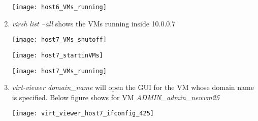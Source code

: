 \begin{enumerate}
\begin{minipage}{\linewidth}
\centering
\texttt{[image: host6\_VMs\_running]}
\end{minipage}

\item \textit{virsh list --all} shows the VMs running inside 10.0.0.7

\begin{minipage}{\linewidth}
\centering
\texttt{[image: host7\_VMs\_shutoff]}
\end{minipage}

\begin{minipage}{\linewidth}

\centering
\texttt{[image: host7\_startinVMs]}
\end{minipage}

\begin{minipage}{\linewidth}
\centering
\texttt{[image: host7\_VMs\_running]}
\end{minipage}

\item \textit{virt-viewer domain\_name} will open the GUI for the VM whose domain name is specified. Below figure shows for VM \textit{ADMIN\_admin\_newvm25}


\begin{minipage}{\linewidth}
\centering
\texttt{[image: virt\_viewer\_host7\_ifconfig\_425]}
\end{minipage}
\end{enumerate}
